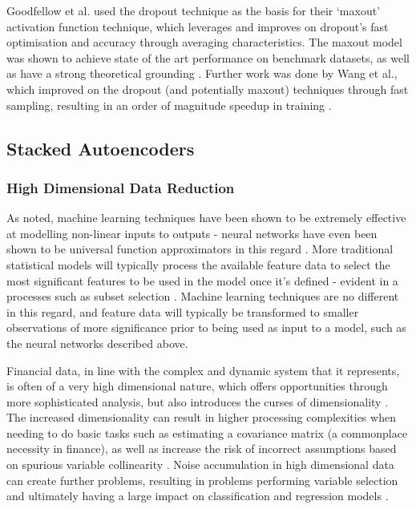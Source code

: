 \documentclass[a4paper,latin]{paper}
\begin{document}
Goodfellow et al. used the dropout technique as the basis for their ‘maxout’ activation function technique, which 
leverages and improves on dropout’s fast optimisation and accuracy through averaging characteristics. The 
maxout model was shown to achieve state of the art performance on benchmark datasets, as well as have a 
strong theoretical grounding \cite{Goodfellow}. Further work was done by Wang et al., which improved on the dropout 
(and potentially maxout) techniques through fast sampling, resulting in an order of magnitude speedup in
training \cite{Wang2}.
\hfill \break 










\subsection{Stacked Autoencoders}\label{lr_SAE}

\subsubsection{High Dimensional Data Reduction}\label{HDDR}

As noted, machine learning techniques have been shown to be extremely effective at modelling non-linear inputs 
to outputs - neural networks have even been shown to be universal function approximators in this regard \cite{Hornik}. 
More traditional statistical models will typically process the available feature data to select the most significant 
features to be used in the model once it’s defined - evident in a processes such as subset selection \cite{Schaefer}. 
Machine learning techniques are no different in this regard, and feature data will typically be transformed to smaller 
observations of more significance prior to being used as input to a model, such as the neural networks described above.
\hfill \break 

Financial data, in line with the complex and dynamic system that it represents, is often of a very high dimensional 
nature, which offers opportunities through more sophisticated analysis, but also introduces the curses of
 dimensionality \cite{Donoho}. The increased dimensionality can result in higher processing complexities when needing to 
 do basic tasks such as estimating a covariance matrix (a commonplace necessity in finance), as well as increase 
 the risk of incorrect assumptions based on spurious variable collinearity \cite{Fan1}. Noise accumulation in high 
 dimensional data can create further problems, resulting in problems performing variable selection and ultimately 
 having a large impact on classification and regression models \cite{Fan2}.
\hfill \break 
\end{document}
